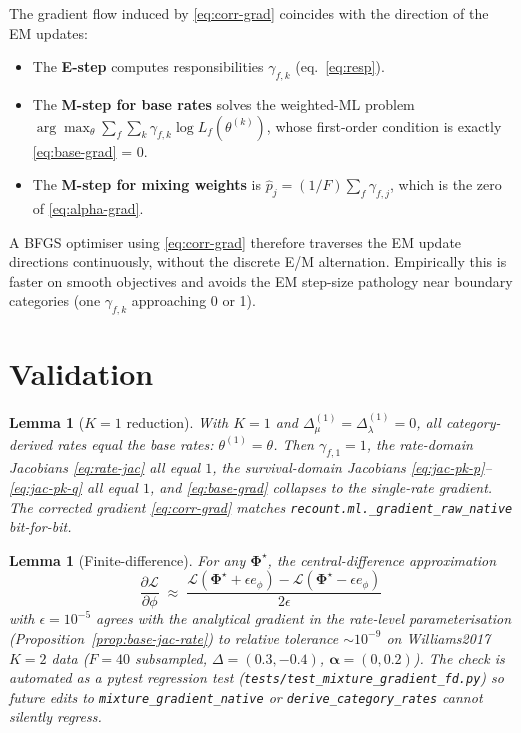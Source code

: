 \documentclass[11pt]{article}
\newcommand{\dup}{\lambda}
\newcommand{\loss}{\mu}
\newcommand{\Ll}{\mathcal{L}}
\newtheorem{lemma}[theorem]{Lemma}
\theoremstyle{definition}
\begin{document}
The gradient flow induced by \eqref{eq:corr-grad} coincides with the
direction of the EM updates:
\begin{itemize}[leftmargin=*]
\item The \textbf{E-step} computes responsibilities
$\gamma_{f,k}$ (eq.~\eqref{eq:resp}).
\item The \textbf{M-step for base rates} solves the weighted-ML
problem
$\arg\max_\theta \sum_f \sum_k \gamma_{f,k}\log L_f(\theta^{(k)})$,
whose first-order condition is exactly \eqref{eq:base-grad} = 0.
\item The \textbf{M-step for mixing weights} is
$\hat p_j = (1/F)\sum_f \gamma_{f,j}$, which is the
zero of \eqref{eq:alpha-grad}.
\end{itemize}
A BFGS optimiser using \eqref{eq:corr-grad} therefore traverses the
EM update directions continuously, without the discrete E/M
alternation. Empirically this is faster on smooth objectives and
avoids the EM step-size pathology near boundary categories (one
$\gamma_{f,k}$ approaching 0 or 1).

\section{Validation}
\label{sec:validation}

\begin{lemma}[$K=1$ reduction]\label{lem:k1}
With $K=1$ and $\Delta_\loss^{(1)} = \Delta_\dup^{(1)} = 0$, all
category-derived rates equal the base rates: $\theta^{(1)} = \theta$.
Then $\gamma_{f,1} = 1$, the rate-domain Jacobians
\eqref{eq:rate-jac} all equal $1$, the survival-domain Jacobians
\eqref{eq:jac-pk-p}--\eqref{eq:jac-pk-q} all equal $1$, and
\eqref{eq:base-grad} collapses to the single-rate gradient. The
corrected gradient \eqref{eq:corr-grad} matches
\texttt{recount.ml.\_gradient\_raw\_native} bit-for-bit.
\end{lemma}

\begin{lemma}[Finite-difference]\label{lem:fd}
For any $\bm\Phi^\star$, the central-difference approximation
\begin{equation*}
\frac{\partial \Ll}{\partial \phi}
\;\approx\;
\frac{\Ll(\bm\Phi^\star + \epsilon e_\phi) - \Ll(\bm\Phi^\star - \epsilon e_\phi)}{2\epsilon}
\end{equation*}
with $\epsilon = 10^{-5}$ agrees with the analytical gradient
\emph{in the rate-level parameterisation}
(Proposition~\ref{prop:base-jac-rate}) to relative tolerance
$\sim 10^{-9}$ on Williams2017 $K=2$ data
($F=40$ subsampled, $\Delta = (0.3, -0.4)$, $\bm\alpha = (0, 0.2)$).
The check is automated as a pytest regression test
(\texttt{tests/test\_mixture\_gradient\_fd.py}) so future edits to
\texttt{mixture\_gradient\_native} or \texttt{derive\_category\_rates}
cannot silently regress.
\end{lemma}
\end{document}
